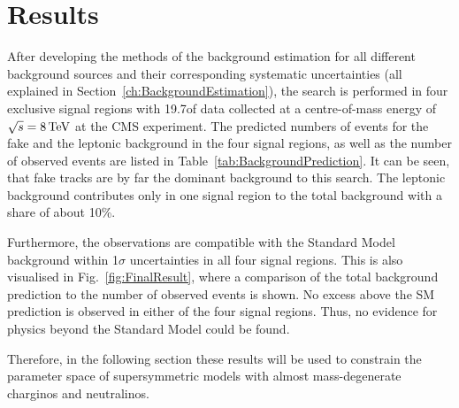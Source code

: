 \FloatBarrier
\chapter{Results}
\label{sec:Results}
After developing the methods of the background estimation for all different background sources and their corresponding systematic uncertainties (all explained in Section~\ref{ch:BackgroundEstimation}), 
the search is performed in four exclusive signal regions with 19.7\fbinv of data collected at a centre-of-mass energy of $\sqrt{s} = 8\,\text{Te}\kern-0.06667em\text{V}$ at the CMS experiment.
The predicted numbers of events for the fake and the leptonic background in the four signal regions, as well as the number of observed events are listed in Table~\ref{tab:BackgroundPrediction}.
It can be seen, that fake tracks are by far the dominant background to this search.
The leptonic background contributes only in one signal region to the total background with a share of about 10\%.

Furthermore, the observations are compatible with the Standard Model background within 1$\sigma$ uncertainties in all four signal regions.
This is also visualised in Fig.~\ref{fig:FinalResult}, where a comparison of the total background prediction to the number of observed events is shown.
No excess above the SM prediction is observed in either of the four signal regions.
Thus, no evidence for physics beyond the Standard Model could be found.

Therefore, in the following section these results will be used to constrain the parameter space of supersymmetric models with almost mass-degenerate charginos and neutralinos.

